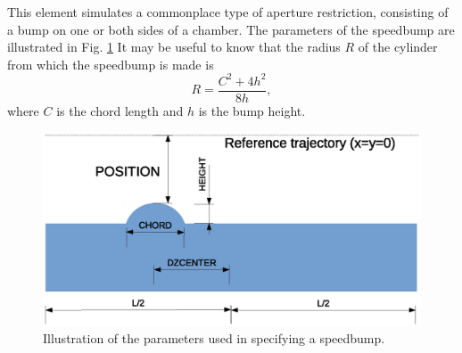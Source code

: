 This element simulates a commonplace type of aperture restriction, consisting of a
bump on one or both sides of a chamber. The parameters of the speedbump are
illustrated in Fig. \ref{fig:speedbump}
It may be useful to know that the radius $R$ of the cylinder from which the
speedbump is made is
\begin{equation}
  R = \frac{C^2 + 4 h^2}{8 h},
\end{equation}
where $C$ is the chord length and $h$ is the bump height.

\begin{figure}[htb]
\center
\includegraphics[width=0.8\linewidth]{speedbump}
\caption{Illustration of the parameters used in specifying a speedbump.}
\label{fig:speedbump}
\end{figure}

\clearpage
